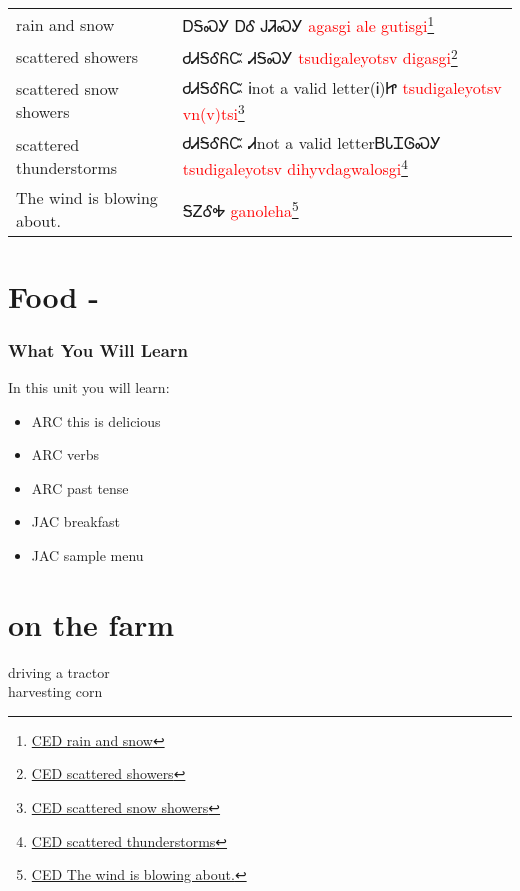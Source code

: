 \begin{minipage}{\linewidth}
\begin{tabular}{p{5cm} p{9cm}}
rain and snow & ᎠᎦᏍᎩ ᎠᎴ ᎫᏘᏍᎩ 
 \newline \textcolor{red}{agasgi ale gutisgi}\footnote{\href{https://cherokeedictionary.net/share/101983}{CED rain and snow}}\\
scattered showers & ᏧᏗᎦᎴᏲᏨ ᏗᎦᏍᎩ 
 \newline \textcolor{red}{tsudigaleyotsv digasgi}\footnote{\href{https://cherokeedictionary.net/share/101984}{CED scattered showers}}\\
scattered snow showers & ᏧᏗᎦᎴᏲᏨ Ꭵnot a valid letter(Ꭵ)Ꮵ 
 \newline \textcolor{red}{tsudigaleyotsv vn(v)tsi}\footnote{\href{https://cherokeedictionary.net/share/101985}{CED scattered snow showers}}\\
scattered thunderstorms & ᏧᏗᎦᎴᏲᏨ  Ꮧnot a valid letterᏴᏓᏆᎶᏍᎩ 
 \newline \textcolor{red}{tsudigaleyotsv  dihyvdagwalosgi}\footnote{\href{https://cherokeedictionary.net/share/101986}{CED scattered thunderstorms}}\\
The wind is blowing about. & ᎦᏃᎴᎭ 
 \newline \textcolor{red}{ganoleha}\footnote{\href{https://cherokeedictionary.net/share/101987}{CED The wind is blowing about.}}\\
\end{tabular}
\end{minipage}

\index{}
\chapter*{Food - }
\subsection{What You Will Learn}
In this unit you will learn:
\begin{itemize}
\item ARC this is delicious
\item ARC verbs
\item ARC past tense
\item JAC breakfast
\item JAC sample menu
\end{itemize}\newpage

\newpage{}
\chapter*{on the farm}
driving a tractor\\
harvesting corn\\
